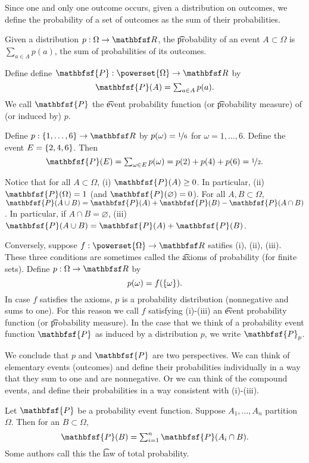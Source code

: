 

Since one and only one outcome occurs, given a distribution on outcomes, we define the probability of a set of outcomes as the sum of their probabilities.


Given a distribution $p: \Omega  \to \R $, the \t{probability of an event} $A \subset \Omega $ is $\sum_{a \in A} p(a)$, the sum of probabilities of its outcomes.

Define define $\mathbfsf{P} : \powerset{\Omega } \to \R $ by
  \[
\textstyle
\mathbfsf{P} (A) = \sum_{a \in A} p(a).
  \]
We call $\mathbfsf{P} $ the \t{event probability function} (or \t{probability measure}) of (or induced by) $p$.

Define $p: \set{1, \dots, 6} \to \R $ by $p(\omega ) = \nicefrac{1}{6}$ for $\omega  = 1, \dots, 6$.
Define the event $E = \{2, 4, 6\}$.
Then
  \[
\textstyle
\mathbfsf{P} (E) = \sum_{\omega  \in E} p(\omega ) = p(2) + p(4) + p(6) = \nicefrac{1}{2}.
  \]

Notice that for all $A \subset \Omega $, (i) $\mathbfsf{P} (A) \geq 0$.
In particular, (ii) $\mathbfsf{P} (\Omega ) = 1$ (and $\mathbfsf{P} (\varnothing) = 0$).
For all $A, B \subset \Omega $, $\mathbfsf{P} (A \cup B) = \mathbfsf{P} (A) + \mathbfsf{P} (B) - \mathbfsf{P} (A \cap B)$.
In particular, if $A \cap B = \varnothing$, (iii) $\mathbfsf{P} (A \cup B) = \mathbfsf{P} (A) + \mathbfsf{P} (B)$.

Conversely, suppose $f: \powerset{\Omega } \to \R $ satifies (i), (ii), (iii).
These three conditions are sometimes called the \t{axioms of probability} (for finite sets).
Define $p: \Omega  \to \R $ by
  \[
p(\omega ) = f(\{\omega \}).
  \]
In case $f$ satisfies the axioms, $p$ is a probability distribution (nonnegative and sums to one).
For this reason we call $f$ satisfying (i)-(iii) an \t{event probability function} (or \t{probability measure}).
In the case that we think of a probability event function $\mathbfsf{P} $ as induced by a distribution $p$, we write $\mathbfsf{P} _p$.

We conclude that $p$ and $\mathbfsf{P} $ are two perspectives.
We can think of elementary events (outcomes) and define their probabilities individually in a way that they sum to one and are nonnegative.
Or we can think of the compound events, and define their probabilities in a way consistent with (i)-(iii).

Let $\mathbfsf{P} $ be a probability event function.
Suppose $A_1, \dots, A_n$ partition $\Omega $.
Then for an $B \subset \Omega $,
  \[
\textstyle
\mathbfsf{P} (B) = \sum_{i = 1}^{n} \mathbfsf{P} (A_i \cap B).
  \]
Some authors call this the \t{law of total probability}.
